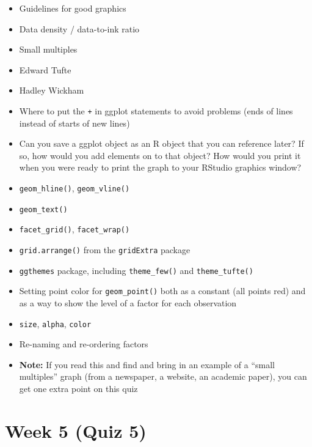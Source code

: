 \documentclass[]{book}
\providecommand{\tightlist}{%
  \setlength{\itemsep}{0pt}\setlength{\parskip}{0pt}}
\begin{document}
\begin{itemize}
\tightlist
\item
  Guidelines for good graphics
\item
  Data density / data-to-ink ratio
\item
  Small multiples
\item
  Edward Tufte
\item
  Hadley Wickham
\item
  Where to put the \texttt{+} in ggplot statements to avoid problems
  (ends of lines instead of starts of new lines)
\item
  Can you save a ggplot object as an R object that you can reference
  later? If so, how would you add elements on to that object? How would
  you print it when you were ready to print the graph to your RStudio
  graphics window?
\item
  \texttt{geom\_hline()}, \texttt{geom\_vline()}
\item
  \texttt{geom\_text()}
\item
  \texttt{facet\_grid()}, \texttt{facet\_wrap()}
\item
  \texttt{grid.arrange()} from the \texttt{gridExtra} package
\item
  \texttt{ggthemes} package, including \texttt{theme\_few()} and
  \texttt{theme\_tufte()}
\item
  Setting point color for \texttt{geom\_point()} both as a constant (all
  points red) and as a way to show the level of a factor for each
  observation
\item
  \texttt{size}, \texttt{alpha}, \texttt{color}
\item
  Re-naming and re-ordering factors
\item
  \textbf{Note:} If you read this and find and bring in an example of a
  ``small multiples'' graph (from a newspaper, a website, an academic
  paper), you can get one extra point on this quiz
\end{itemize}

\section{Week 5 (Quiz 5)}\label{week-5-quiz-5}
\end{document}
